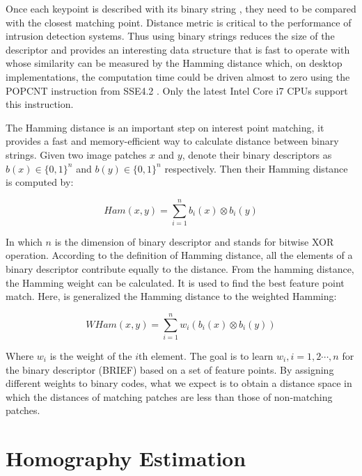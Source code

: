 Once each keypoint is described with its binary string \cite{Calonder2010}, they need to be compared with the closest matching point. Distance metric is critical to the performance of intrusion detection systems. Thus using binary strings reduces the size of the descriptor and provides an interesting data structure that is fast to operate with whose similarity can be measured by the Hamming distance which, on desktop implementations, the computation time could be driven almost to zero using the POPCNT instruction from SSE4.2 \cite{Intel2007}. Only the latest Intel Core i7 CPUs support this instruction.

The Hamming distance is an important step on interest point matching, it provides a fast and memory-efficient way to calculate distance between binary strings. Given two image patches $x$ and $y$, denote their binary descriptors as $b(x) \in \{0,1\}^n$ and $b(y) \in \{0,1\}^n$ respectively. Then their Hamming distance is computed by:

$$Ham(x, y)=\sum_{i=1}^{n}b_i(x)\otimes b_i(y)$$

In which $n$ is the dimension of binary descriptor and stands for bitwise XOR operation. According to the definition of Hamming distance, all the elements of a binary descriptor contribute equally to the distance. From the hamming distance, the Hamming weight can be calculated. It is used to find the best feature point match. Here, is generalized the Hamming distance to the weighted Hamming:

$$WHam(x, y)=\sum_{i=1}^{n}w_i(b_i(x)\otimes b_i(y))$$

Where $w_i$ is the weight of the $i$th element. The goal is to learn $w_i,i=1,2\cdots,n$ for the binary descriptor (BRIEF) based on a set of feature points. By assigning different weights to binary codes, what we expect is to obtain a distance space in which the distances of matching patches are less than those of non-matching patches.



\section{Homography Estimation} %
\label{sec:ar_library_for_the_web:homography_estimation}


